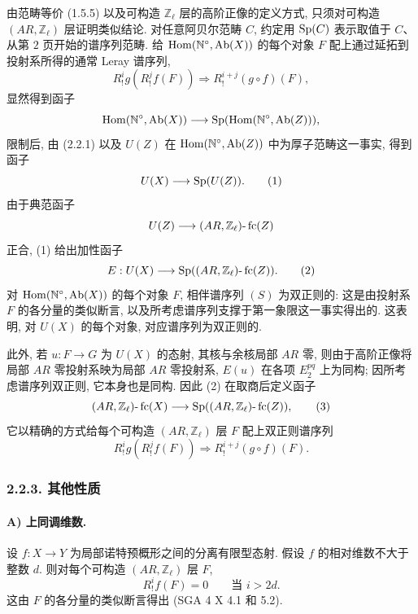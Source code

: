 \begin{prooftext}[证明]
由范畴等价 (1.5.5) 以及可构造 \(\mathbb Z_\ell\) 层的高阶正像的定义方式, 只须对可构造 \((AR,\mathbb Z_\ell)\) 层证明类似结论. 对任意阿贝尔范畴 \(C\), 约定用 \(\operatorname{Sp}(C)\) 表示取值于 \(C\)、从第 \(2\) 页开始的谱序列范畴. 给 \(\operatorname{Hom}(\mathbb N^\circ,\operatorname{Ab}(X))\) 的每个对象 \(F\) 配上通过延拓到投射系所得的通常 Leray 谱序列,
\[
R^i_! g(R^j_! f(F))\Longrightarrow R^{i+j}_!(g\circ f)(F),
\tag{S}
\]
显然得到函子
\[
\operatorname{Hom}(\mathbb N^\circ,\operatorname{Ab}(X))\longrightarrow \operatorname{Sp}(\operatorname{Hom}(\mathbb N^\circ,\operatorname{Ab}(Z))),
\]
限制后, 由 (2.2.1) 以及 \(U(Z)\) 在 \(\operatorname{Hom}(\mathbb N^\circ,\operatorname{Ab}(Z))\) 中为厚子范畴这一事实, 得到函子
\[
U(X)\longrightarrow \operatorname{Sp}(U(Z)).
\tag{1}
\]
由于典范函子
\[
U(Z)\longrightarrow (AR,\mathbb Z_\ell)\text{-}\operatorname{fc}(Z)
\]
正合, (1) 给出加性函子
\[
E:U(X)\longrightarrow \operatorname{Sp}((AR,\mathbb Z_\ell)\text{-}\operatorname{fc}(Z)).
\tag{2}
\]
对 \(\operatorname{Hom}(\mathbb N^\circ,\operatorname{Ab}(X))\) 的每个对象 \(F\), 相伴谱序列 \((S)\) 为双正则的: 这是由投射系 \(F\) 的各分量的类似断言, 以及所考虑谱序列支撑于第一象限这一事实得出的. 这表明, 对 \(U(X)\) 的每个对象, 对应谱序列为双正则的.

此外, 若 \(u:F\to G\) 为 \(U(X)\) 的态射, 其核与余核局部 \(AR\) 零, 则由于高阶正像将局部 \(AR\) 零投射系映为局部 \(AR\) 零投射系, \(E(u)\) 在各项 \(E_2^{pq}\) 上为同构; 因所考虑谱序列双正则, 它本身也是同构. 因此 (2) 在取商后定义函子
\[
(AR,\mathbb Z_\ell)\text{-}\operatorname{fc}(X)
\longrightarrow \operatorname{Sp}((AR,\mathbb Z_\ell)\text{-}\operatorname{fc}(Z)),
\tag{3}
\]
它以精确的方式给每个可构造 \((AR,\mathbb Z_\ell)\) 层 \(F\) 配上双正则谱序列
\[
R^i_!g(R^j_!f(F))\Longrightarrow R^{i+j}_!(g\circ f)(F).
\]
\end{prooftext}

\subsubsection*{2.2.3. 其他性质}

\paragraph{A) 上同调维数.}
设 \(f:X\to Y\) 为局部诺特预概形之间的分离有限型态射. 假设 \(f\) 的相对维数不大于整数 \(d\). 则对每个可构造 \((AR,\mathbb Z_\ell)\) 层 \(F\),
\[
R^i_!f(F)=0\qquad\text{当 }i>2d.
\]
这由 \(F\) 的各分量的类似断言得出 (SGA 4 X 4.1 和 5.2).

